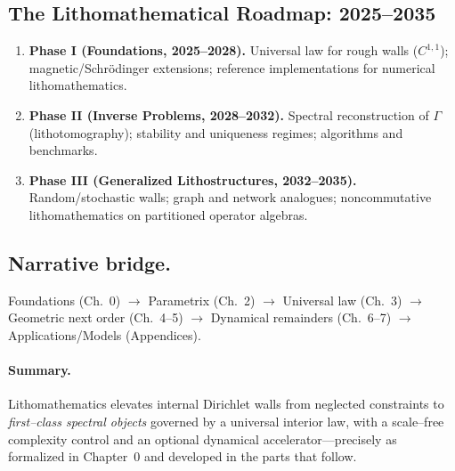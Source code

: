 \subsection{The Lithomathematical Roadmap: 2025–2035}\label{subsec:roadmap}
\begin{enumerate}
  \item \textbf{Phase I (Foundations, 2025–2028).} Universal law for rough walls ($C^{1,1}$); magnetic/Schr\"odinger extensions; reference implementations for numerical lithomathematics.
  \item \textbf{Phase II (Inverse Problems, 2028–2032).} Spectral reconstruction of $\Gamma$ (lithotomography); stability and uniqueness regimes; algorithms and benchmarks.
  \item \textbf{Phase III (Generalized Lithostructures, 2032–2035).} Random/stochastic walls; graph and network analogues; noncommutative lithomathematics on partitioned operator algebras.
\end{enumerate}

\subsection{Narrative bridge.}\label{subsec:narrative}
Foundations (Ch.~0) $\to$ Parametrix (Ch.~2) $\to$ Universal law (Ch.~3) $\to$ Geometric next order (Ch.~4–5) $\to$ Dynamical remainders (Ch.~6–7) $\to$ Applications/Models (Appendices).

\paragraph{Summary.}
Lithomathematics elevates internal Dirichlet walls from neglected constraints to \emph{first–class spectral objects} governed by a universal interior law, with a scale–free complexity control and an optional dynamical accelerator—precisely as formalized in Chapter~0 and developed in the parts that follow.

